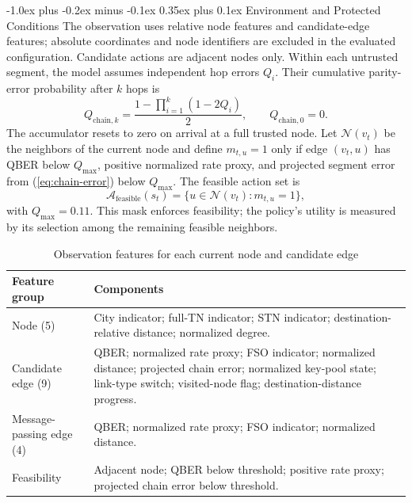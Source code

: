 \documentclass[journal]{IEEEtran}
\makeatletter
\def\subsubsection{\@startsection{subsubsection}{3}{\z@}%
  {-1.0ex plus -0.2ex minus -0.1ex}%
  {0.35ex plus 0.1ex}%
  {\normalfont\bfseries\itshape\fontsize{9.5}{11}\selectfont}}
\makeatother
\begin{document}
\subsubsection{Environment and Protected Conditions}
The observation uses relative node features and candidate-edge features; absolute coordinates and node identifiers are excluded in the evaluated configuration. Candidate actions are adjacent nodes only. Within each untrusted segment, the model assumes independent hop errors $Q_i$. Their cumulative parity-error probability after $k$ hops is
\begin{equation}
 Q_{\mathrm{chain},k}=\frac{1-\prod_{i=1}^{k}(1-2Q_i)}{2},
 \qquad Q_{\mathrm{chain},0}=0.
 \label{eq:chain-error}
\end{equation}
The accumulator resets to zero on arrival at a full trusted node. Let $\mathcal{N}(v_t)$ be the neighbors of the current node and define $m_{t,u}=1$ only if edge $(v_t,u)$ has QBER below $Q_{\max}$, positive normalized rate proxy, and projected segment error from (\ref{eq:chain-error}) below $Q_{\max}$. The feasible action set is
\begin{equation}
 \mathcal{A}_{\mathrm{feasible}}(s_t)=\{u\in\mathcal{N}(v_t):m_{t,u}=1\},
 \label{eq:feasible-actions}
\end{equation}
with $Q_{\max}=0.11$. This mask enforces feasibility; the policy's utility is measured by its selection among the remaining feasible neighbors.

\begin{table}[t]
\caption{Observation features for each current node and candidate edge}
\label{tab:features}
\centering
\scriptsize
\begin{tabular}{@{}p{}p{}@{}}
\toprule
Feature group & Components\\
\midrule
Node (5) & City indicator; full-TN indicator; STN indicator; destination-relative distance; normalized degree.\\
Candidate edge (9) & QBER; normalized rate proxy; FSO indicator; normalized distance; projected chain error; normalized key-pool state; link-type switch; visited-node flag; destination-distance progress.\\
Message-passing edge (4) & QBER; normalized rate proxy; FSO indicator; normalized distance.\\
Feasibility & Adjacent node; QBER below threshold; positive rate proxy; projected chain error below threshold.\\
\bottomrule
\end{tabular}
\end{table}
\end{document}
